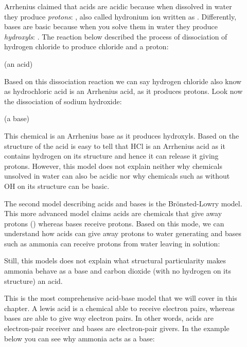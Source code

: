 \documentclass[main.tex]{subfiles}
\begin{document}
\begin{description}
\item[] Arrhenius claimed that acids are acidic because when dissolved in water they produce \emph{protons}: , also called hydronium ion written as . Differently, bases are basic because when you solve them in water they produce \emph{hydroxyls}: . The reaction below described the process of dissociation of hydrogen chloride to produce chloride and a proton:
\begin{center}\hfill (an acid)\end{center}
Based on this dissociation reaction we can say hydrogen chloride also know as hydrochloric acid is an Arrhenius acid, as it produces protons. Look now the dissociation of sodium hydroxide:
\begin{center}\hfill (a base)\end{center}
This chemical is an Arrhenius base as it produces hydroxyls. Based on the structure of the acid is easy to tell that HCl is an Arrhenius acid as it contains hydrogen on its structure and hence it can release it giving protons. However, this model does not explain neither why chemicals unsolved in water can also be acidic nor why chemicals such as  without OH on its structure can be basic.
\item[]
The second model describing acids and bases is the Br\"{o}nsted-Lowry model. This more advanced model claims acids are chemicals that give away protons () whereas bases receive protons. Based on this mode, we can understand how acids can give away protons to water generating  and bases such as ammonia can receive protons from water leaving  in solution:
\begin{center}\end{center}
Still, this models does not explain what structural particularity makes ammonia behave as a base and carbon dioxide (with no hydrogen on its structure) an acid.
\item[]
This is the most comprehensive acid-base model that we will cover in this chapter. A lewis acid is a chemical able to receive electron pairs, whereas bases are able to give way electron pairs. In other words, acids are electron-pair receiver and bases are electron-pair givers. In the example below you can see why ammonia acts as a base:

\end{description}
\end{document}
